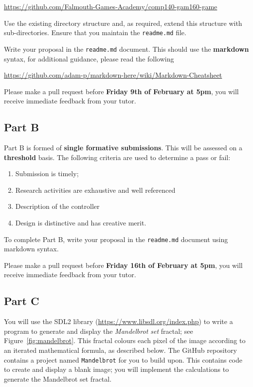 \documentclass{../../../fal_assignment}
\begin{document}
\indent \url{https://github.com/Falmouth-Games-Academy/comp140-gam160-game}

Use the existing directory structure and, as required, extend this structure with sub-directories. Ensure that you maintain the \texttt{readme.md} file.

Write your proposal in the \texttt{readme.md} document. This should use the \textbf{markdown} syntax, for additional guidance, please read the following  

\indent \url{https://github.com/adam-p/markdown-here/wiki/Markdown-Cheatsheet}

Please make a pull request before \textbf{Friday 9th of February at 5pm}, you will receive immediate feedback from your tutor. 

\subsection*{Part B}

Part B is formed of \textbf{single formative submissions}. This will be assessed on a \textbf{threshold} basis. The following criteria are used to determine a pass or fail:

\begin{enumerate}[label=(\alph*)]
	\item Submission is timely;
	\item Research activities are exhaustive and well referenced
	\item Description of the controller 
	\item Design is distinctive and has creative merit.
\end{enumerate}

To complete Part B, write your proposal in the \texttt{readme.md} document using markdown syntax.

Please make a pull request before \textbf{Friday 16th of February at 5pm}, you will receive immediate feedback from your tutor. 

\subsection*{Part C}

You will use the SDL2 library (\url{https://www.libsdl.org/index.php}) to write a program to generate and display the \emph{Mandelbrot set} fractal; see Figure~\ref{fig:mandelbrot}.
This fractal colours each pixel of the image according to an iterated mathematical formula, as described below.
The GitHub repository contains a project named \texttt{Mandelbrot} for you to build upon.
This contains code to create and display a blank image; you will implement the calculations to generate the Mandelbrot set fractal.
\end{document}
